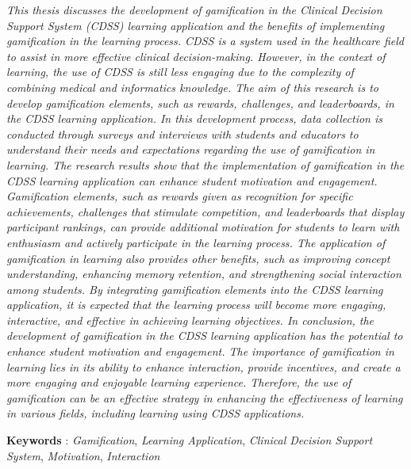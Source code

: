 \textit{
	This thesis discusses the development of gamification in the Clinical Decision Support System (CDSS) learning application and the benefits of implementing gamification in the learning process. CDSS is a system used in the healthcare field to assist in more effective clinical decision-making. However, in the context of learning, the use of CDSS is still less engaging due to the complexity of combining medical and informatics knowledge.
The aim of this research is to develop gamification elements, such as rewards, challenges, and leaderboards, in the CDSS learning application. In this development process, data collection is conducted through surveys and interviews with students and educators to understand their needs and expectations regarding the use of gamification in learning.
The research results show that the implementation of gamification in the CDSS learning application can enhance student motivation and engagement. Gamification elements, such as rewards given as recognition for specific achievements, challenges that stimulate competition, and leaderboards that display participant rankings, can provide additional motivation for students to learn with enthusiasm and actively participate in the learning process.
The application of gamification in learning also provides other benefits, such as improving concept understanding, enhancing memory retention, and strengthening social interaction among students. By integrating gamification elements into the CDSS learning application, it is expected that the learning process will become more engaging, interactive, and effective in achieving learning objectives.
In conclusion, the development of gamification in the CDSS learning application has the potential to enhance student motivation and engagement. The importance of gamification in learning lies in its ability to enhance interaction, provide incentives, and create a more engaging and enjoyable learning experience. Therefore, the use of gamification can be an effective strategy in enhancing the effectiveness of learning in various fields, including learning using CDSS applications.
}

\noindent\textbf{Keywords} : \textit{Gamification}, \textit{Learning Application}, \textit{Clinical Decision Support System}, \textit{Motivation}, \textit{Interaction}